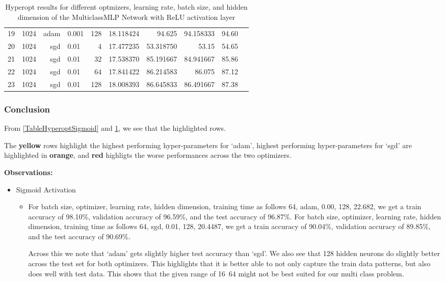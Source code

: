 \begin{solve}
\begin{enumerate}
\begin{table}[H]
\begin{tabular}{rlrlrrrrrr}
    19 & 1024 & adam & 0.001 & 128 & 18.118424 & 94.625 & 94.158333 & 94.60 \\
    20 & 1024 & sgd & 0.01 & 4 & 17.477235 & 53.318750 & 53.15 & 54.65 \\
    21 & 1024 & sgd & 0.01 & 32 & 17.538370 & 85.191667 & 84.941667 & 85.86 \\
    22 & 1024 & sgd & 0.01 & 64 & 17.841422 & 86.214583 & 86.075 & 87.12 \\
    23 & 1024 & sgd & 0.01 & 128 & 18.008393 & 86.645833 & 86.491667 & 87.38 \\
    \bottomrule
    \end{tabular}
    \caption{Hyperopt results for different optmizers, learning rate, batch size, and hidden dimension of the MulticlassMLP Network with ReLU activation layer}
    \label{TableHyperoptRelu}
\end{table}
    \end{enumerate}

    \subsubsection{Conclusion}
    From \ref{TableHyperoptSigmoid} and \ref{TableHyperoptRelu}, we see that the highlighted rows.

    The \textbf{yellow} rows highlight the highest performing hyper-parameters for `adam', highest performing hyper-parameters for `sgd' are highlighted in \textbf{orange}, and \textbf{red} highligts the worse performances across the two optimizers.

    \textbf{Observations: } 
    \begin{itemize}

        \item Sigmoid Activation
        
        \begin{itemize}
            \item 
            
            For batch size, optimizer, learning rate, hidden dimension, training time as follows
            64, adam, 0.00, 128, 22.682, we get a train accuracy of 98.10\%, validation accuracy of 96.59\%, and the test accuracy of 96.87\%. For batch size, optimizer, learning rate, hidden dimension, training time as follows 64, sgd, 0.01, 128, 20.4487, we get a train accuracy of 90.04\%, validation accuracy of  89.85\%, and the test accuracy of 90.69\%.
            
            
            Across this we note that `adam' gets slightly higher test accuracy than `sgd'. We also see that 128 hidden neurons do slightly better across the test set for both optimizers. This highlights that it is better able to not only capture the train data patterns, but also does well with test data. This shows that the given range of 16~64 might not be best suited for our multi class problem. 
            


\end{itemize}
\end{itemize}
\end{solve}

